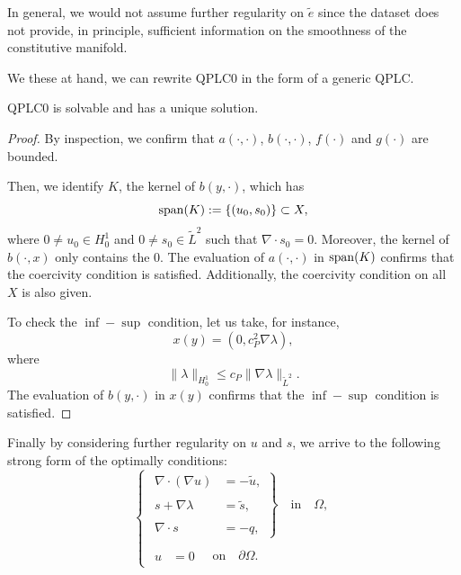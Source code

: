 \begin{remark}
In general, we would not assume further regularity on $\tilde{e}$ since the dataset does not provide, in principle, sufficient information on the smoothness of the constitutive manifold.   
\end{remark}

We these at hand, we can rewrite QPLC0 in the form of a generic QPLC.

\begin{proposition}
QPLC0 is solvable and has a unique solution.
\end{proposition}

\begin{proof}
By inspection, we confirm that $a(\cdot, \cdot)$, $b(\cdot, \cdot)$, $f(\cdot)$ and $g(\cdot)$ are bounded.

Then, we identify $K$, the kernel of $b(y, \cdot)$, which has
\begin{equation}
\operatorname{span}(K) := \left \{ (u_0, s_0) \right \} \subset X,
\end{equation}
where $0 \neq u_0 \in H^1_0$ and $0 \neq s_0 \in \tilde{L}^2$ such that $\nabla \cdot s_0 = 0$. Moreover, the kernel of $b(\cdot, x)$ only contains the $0$. The evaluation of $a(\cdot,\cdot)$ in $\operatorname{span}(K)$ confirms that the coercivity condition is satisfied. Additionally, the coercivity condition on all $X$ is also given.

To check the $\inf-\sup$ condition, let us take, for instance,
\begin{equation}
x(y) = (0, c_{P}^2\nabla \lambda),
\end{equation}
where
\begin{equation}\|\lambda\|_{H^1_0} \leq c_P \|\nabla \lambda\|_{\tilde{L}^2}.
\end{equation}
The evaluation of $b(y, \cdot)$ in $x(y)$ confirms that the  $\inf-\sup$ condition is satisfied.
\end{proof}

Finally by considering further regularity on $u$ and $s$, we arrive to the following strong form of the optimally conditions: 
\begin{equation}    
\left\lbrace
\begin{array}{c}
\left.
\begin{array}{rl}
	\nabla \cdot (\nabla u)         &=-\tilde{u}, \\
    \\
    s+\nabla \lambda &= \tilde{s}, \\
	\\
	\nabla \cdot s   &=-q,
\end{array}
\right\rbrace \quad \textrm{in} \quad \Omega,
\\
\\
\begin{array}{rl}
u &= 0
\quad \end{array}
\textrm{on} \quad \partial\Omega.
\end{array}
\right. 
\end{equation}

